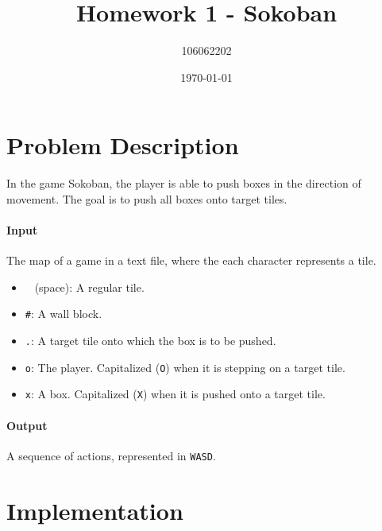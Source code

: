 \documentclass[a4paper, 10pt]{article}
\title{Homework 1 - Sokoban}
\author{106062202}
\date{\today}
\begin{document}
    \maketitle

    \section{Problem Description}
        In the game Sokoban, the player is able to push boxes in the direction of movement.
        The goal is to push all boxes onto target tiles.
        \paragraph{Input}
            The map of a game in a text file, where the each character represents a tile.
            \begin{itemize}
                \item \texttt{ } (space): A regular tile.
                \item \texttt{\#}: A wall block.
                \item \texttt{.}: A target tile onto which the box is to be pushed.
                \item \texttt{o}: The player. Capitalized (\texttt{O}) when it is stepping on a target tile.
                \item \texttt{x}: A box. Capitalized (\texttt{X}) when it is pushed onto a target tile.
            \end{itemize}

        \paragraph{Output}
            A sequence of actions, represented in \texttt{WASD}.

    \section{Implementation}
\end{document}
